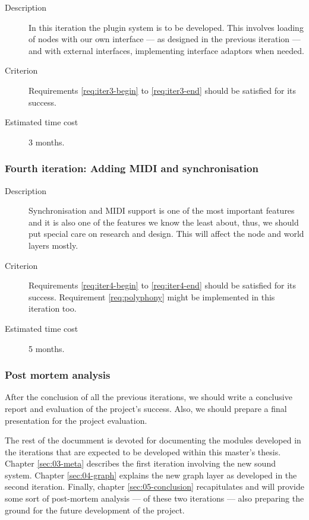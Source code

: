 \begin{description}
\item[Description] In this iteration the plugin system is to be
  developed. This involves loading of nodes with our own interface ---
  as designed in the previous iteration --- and with external
  interfaces, implementing interface adaptors when needed.

\item[Criterion] Requirements \ref{req:iter3-begin} to
  \ref{req:iter3-end} should be satisfied for its success.

\item[Estimated time cost] 3 months.
\end{description}
\subsubsection{Fourth iteration: Adding MIDI and synchronisation}

\begin{description}
\item[Description] Synchronisation and MIDI support is one of the most
  important features and it is also one of the features we know the
  least about, thus, we should put special care on research and
  design. This will affect the node and world layers mostly.

\item[Criterion] Requirements \ref{req:iter4-begin} to
  \ref{req:iter4-end} should be satisfied for its success. Requirement
  \ref{req:polyphony} might be implemented in this iteration too.

\item[Estimated time cost] 5 months.
\end{description}

\subsubsection{Post mortem analysis}

After the conclusion of all the previous iterations, we should write a
conclusive report and evaluation of the project's success. Also, we
should prepare a final presentation for the project evaluation.

\begin{mynote}
  The rest of the documment is devoted for documenting the modules
  developed in the iterations that are expected to be developed within
  this master's thesis. Chapter \ref{sec:03-meta} describes the first
  iteration involving the new sound system. Chapter \ref{sec:04-graph}
  explains the new graph layer as developed in the second
  iteration. Finally, chapter \ref{sec:05-conclusion} recapitulates
  and will provide some sort of post-mortem analysis --- of these two
  iterations --- also preparing the ground for the future development
  of the project.
\end{mynote}

